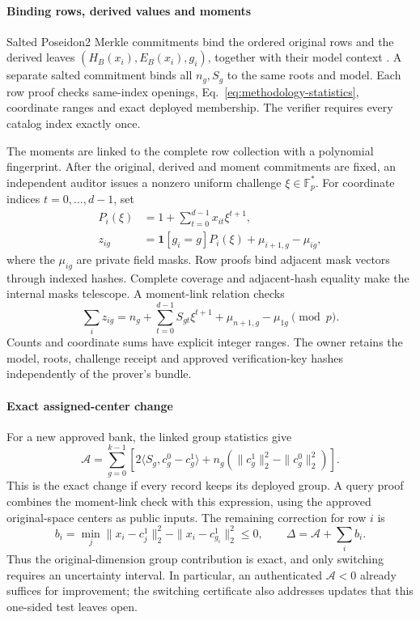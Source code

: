 \paragraph{Binding rows, derived values and moments}
Salted Poseidon2 Merkle commitments bind the ordered original rows and the
derived leaves $(H_B(x_i),E_B(x_i),g_i)$, together with their model context
\cite{poseidon22023}. A separate salted commitment binds all $n_g,S_g$ to
the same roots and model. Each row proof checks same-index openings,
Eq.~\eqref{eq:methodology-statistics}, coordinate ranges and exact deployed
membership. The verifier requires every catalog index exactly once.

The moments are linked to the complete row collection with a polynomial
fingerprint. After the original, derived and moment commitments are fixed,
an independent auditor issues a nonzero uniform challenge
$\xi\in\mathbb F_p^*$. For coordinate indices $t=0,\ldots,d-1$, set
\begin{align}
 P_i(\xi)&=1+\sum_{t=0}^{d-1}x_{it}\xi^{t+1},\nonumber\\
 z_{ig}&=\mathbf1[g_i=g]P_i(\xi)+\mu_{i+1,g}-\mu_{ig},
 \label{eq:methodology-fingerprint}
\end{align}
where the $\mu_{ig}$ are private field masks. Row proofs bind adjacent mask
vectors through indexed hashes. Complete coverage and adjacent-hash equality
make the internal masks telescope. A moment-link relation checks
\begin{equation}
 \sum_i z_{ig}=n_g+\sum_{t=0}^{d-1}S_{gt}\xi^{t+1}
                    +\mu_{n+1,g}-\mu_{1g}\pmod p.
 \label{eq:methodology-moment-link}
\end{equation}
Counts and coordinate sums have explicit integer ranges. The owner retains
the model, roots, challenge receipt and approved verification-key hashes
independently of the prover's bundle.

\paragraph{Exact assigned-center change}
For a new approved bank, the linked group statistics give
\begin{equation}
 \mathcal A=
 \sum_{g=0}^{k-1}\left[
 2\langle S_g,c^0_g-c^1_g\rangle
 +n_g(\|c^1_g\|_2^2-\|c^0_g\|_2^2)\right].
 \label{eq:methodology-assigned}
\end{equation}
This is the exact change if every record keeps its deployed group. A
query proof combines the moment-link check with this expression, using the
approved original-space centers as public inputs. The remaining correction
for row $i$ is
\begin{equation}
 b_i=\min_j\|x_i-c^1_j\|_2^2-\|x_i-c^1_{g_i}\|_2^2\leq0,
 \qquad \Delta=\mathcal A+\sum_i b_i.
 \label{eq:methodology-decomposition}
\end{equation}
Thus the original-dimension group contribution is exact, and only switching
requires an uncertainty interval. In particular, an authenticated
$\mathcal A<0$ already suffices for improvement; the switching certificate
also addresses updates that this one-sided test leaves open.

